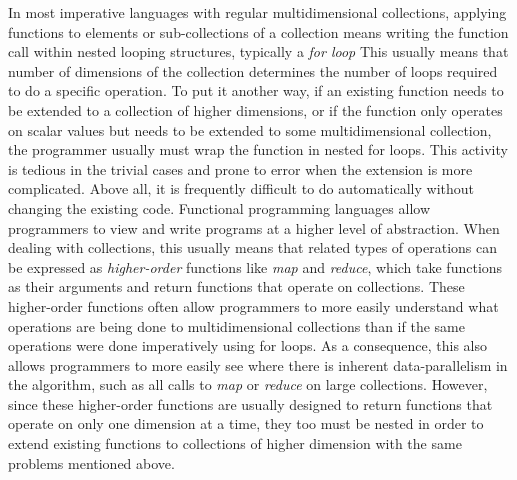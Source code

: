 In most imperative languages with regular multidimensional collections, applying functions to elements or sub-collections of a collection means writing the function call within nested looping structures, typically a \textit{for loop}
This usually means that number of dimensions of the collection determines the number of loops required to do a specific operation.%
To put it another way, if an existing function needs to be extended to a collection of higher dimensions, or if the function only operates on scalar values but needs to be extended to some multidimensional collection, the programmer usually must wrap the function in nested for loops. %
This activity is tedious in the trivial cases and prone to error when the extension is more complicated. %
Above all, it is frequently difficult to do automatically without changing the existing code.%
Functional programming languages allow programmers to view and write programs at a higher level of abstraction.
When dealing with collections, this usually means that related types of operations can be expressed as \textit{higher-order} functions like \textit{map} and \textit{reduce}, which take functions as their arguments and return functions that operate on collections. %
These higher-order functions often allow programmers to more easily understand what operations are being done to multidimensional collections than if the same operations were done imperatively using for loops. %
As a consequence, this also allows programmers to more easily see where there is inherent data-parallelism in the algorithm, such as all calls to \textit{map} or \textit{reduce} on large collections.
However, since these higher-order functions are usually designed to return functions that operate on only one dimension at a time, they too must be nested in order to extend existing functions to collections of higher dimension with the same problems mentioned above.

